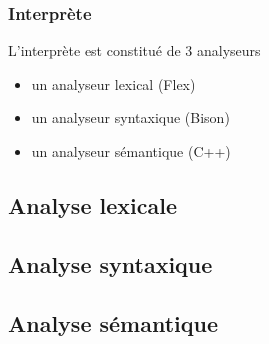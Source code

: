 \begin{frame}
\frametitle{Interprète}
L'interprète est constitué de 3 analyseurs
\begin{itemize}
\item un analyseur lexical (Flex)
\item un analyseur syntaxique (Bison)
\item un analyseur sémantique (C++)
\end{itemize}
\end{frame}

\subsection{Analyse lexicale}


\subsection{Analyse syntaxique}


\subsection{Analyse sémantique}

